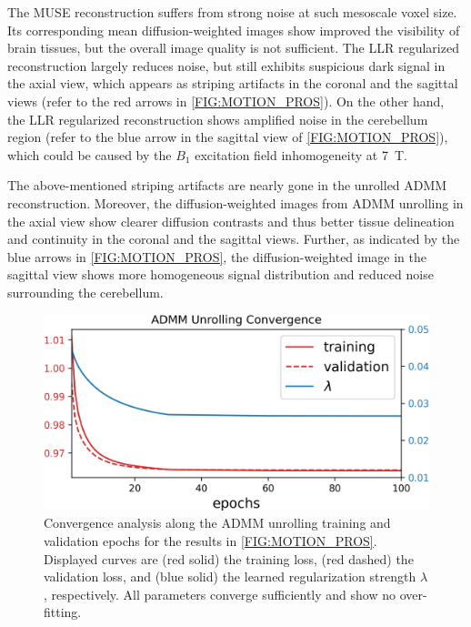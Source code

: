 \documentclass[AMA,STIX2COL,Linenumberson]{MRM}
\begin{document}
The MUSE reconstruction suffers from strong noise
at such mesoscale voxel size.
Its corresponding mean diffusion-weighted images show
improved the visibility of brain tissues,
but the overall image quality is not sufficient.
The LLR regularized reconstruction largely reduces noise,
but still exhibits suspicious dark signal in the axial view,
which appears as striping artifacts in the coronal and the sagittal views
(refer to the red arrows in \cref{FIG:MOTION_PROS}).
On the other hand, the LLR regularized reconstruction
shows amplified noise in the cerebellum region
(refer to the blue arrow in the sagittal view of \cref{FIG:MOTION_PROS}),
which could be caused by the $B_1$ excitation field inhomogeneity
at \SI{7}{\tesla}.

The above-mentioned striping artifacts are nearly gone
in the unrolled ADMM reconstruction.
Moreover, the diffusion-weighted images from ADMM unrolling in the axial view
show clearer diffusion contrasts
and thus better tissue delineation and continuity
in the coronal and the sagittal views.
Further, as indicated by the blue arrows in \cref{FIG:MOTION_PROS},
the diffusion-weighted image in the sagittal view shows more homogeneous
signal distribution and reduced noise surrounding the cerebellum.

\begin{figure}
    \centering
    \includegraphics[width=\columnwidth]{./figures/fig7.png}
    \caption{Convergence analysis along the ADMM unrolling training
        and validation epochs
        for the results in \cref{FIG:MOTION_PROS}.
        Displayed curves are (red solid) the training loss,
        (red dashed) the validation loss,
        and (blue solid) the learned regularization strength $\lambda$, respectively.
        All parameters converge sufficiently and show no over-fitting.}
    \label{FIG:CONVERGENCE}
\end{figure}
\end{document}

